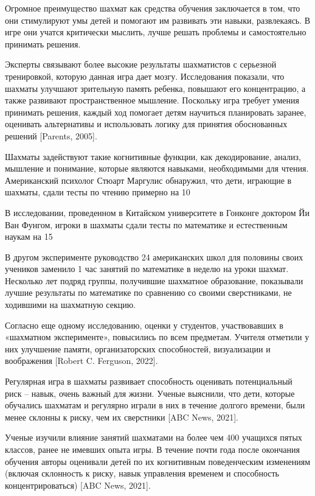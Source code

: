 Огромное преимущество шахмат как средства обучения заключается в том, что они стимулируют умы детей и помогают им развивать эти навыки, развлекаясь. В игре они учатся критически мыслить, лучше решать проблемы и самостоятельно принимать решения.

Эксперты связывают более высокие результаты шахматистов с серьезной тренировкой, которую данная игра дает мозгу. Исследования показали, что шахматы улучшают зрительную память ребенка, повышают его концентрацию, а также развивают пространственное мышление. Поскольку игра требует умения принимать решения, каждый ход помогает детям научиться планировать заранее, оценивать альтернативы и использовать логику для принятия обоснованных решений [Parents, 2005].

Шахматы задействуют такие когнитивные функции, как декодирование, анализ, мышление и понимание, которые являются навыками, необходимыми для чтения. Американский психолог Стюарт Маргулис обнаружил, что дети, играющие в шахматы, сдали тесты по чтению примерно на 10%

В исследовании, проведенном в Китайском университете в Гонконге доктором Йи Ван Фунгом, игроки в шахматы сдали тесты по математике и естественным наукам на 15%

В другом эксперименте руководство 24 американских школ для половины своих учеников заменило 1 час занятий по математике в неделю на уроки шахмат. Несколько лет подряд группы, получившие шахматное образование, показывали лучшие результаты по математике по сравнению со своими сверстниками, не ходившими на шахматную секцию.

Согласно еще одному исследованию, оценки у студентов, участвовавших в «шахматном эксперименте», повысились по всем предметам. Учителя отметили у них улучшение памяти, организаторских способностей, визуализации и воображения [Robert C. Ferguson, 2022].

Регулярная игра в шахматы развивает способность оценивать потенциальный риск – навык, очень важный для жизни. Ученые выяснили, что дети, которые обучались шахматам и регулярно играли в них в течение долгого времени, были менее склонны к риску, чем их сверстники [ABC News, 2021].

Ученые изучили влияние занятий шахматами на более чем 400 учащихся пятых классов, ранее не имевших опыта игры. В течение почти года после окончания обучения авторы оценивали детей по их когнитивным поведенческим изменениям (включая склонность к риску, навык управления временем и способность концентрироваться) [ABC News, 2021].

